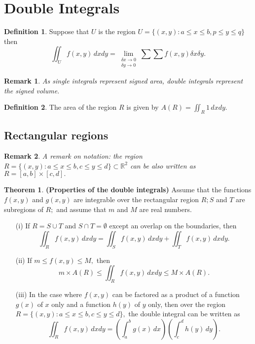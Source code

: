 \documentclass[12pt, a4paper]{article}
\newcommand{\bb}[1]{\mathbb{#1}}
\newtheorem*{remark}{Remark}
\theoremstyle{definition}
\newtheorem{definition}{Definition}[section]
\newtheorem{theorem}{Theorem}[section]
\theoremstyle{plain}
\begin{document}
\section{Double Integrals}

\begin{definition}
Suppose that $U$ is the region $U=\{(x,y) : a \leq x\leq b, p \leq y \leq q\}$ then $$\iint_U f(x,y)\, dxdy = \lim_{\substack{\delta x \to 0 \\ \delta y \to 0}} \sum \sum f(x,y) \delta x \delta y.$$
\end{definition}

\begin{remark}
As single integrals represent signed area, double integrals represent the signed volume.
\end{remark}

\begin{definition}
The area of the region $R$ is given by $A(R) = \iint_R 1 \, dxdy.$
\end{definition}

\subsection{Rectangular regions}

\begin{remark}
A remark on notation: the region $R = \{(x,y) : a \leq x \leq b, c\leq y \leq d\} \subset \bb{R}^2$ can be also written as $R=[a,b]\times[c,d].$
\end{remark}

\begin{theorem}
\textbf{(Properties of the double integrals)} Assume that the functions $f (x, y)$ and $g(x, y)$ are integrable over the rectangular region $R; S$ and $T$ are subregions of $R;$ and assume that $m$ and $M$ are real numbers. \begin{enumerate}
	
	\item[(i)] If $R=S \cup T$ and $S\cap T = \emptyset$ except an overlap on the boundaries, then $$\iint_Rf(x,y) \, dxdy = \iint_S f(x,y) \, dxdy+ \iint_T f(x,y) \, dxdy.$$

	\item[(ii)] If $m \leq f(x,y) \leq M,$ then $$m \times A(R) \leq \iint_R f(x,y) \, dxdy \leq M \times A(R).$$

	\item[(iii)] In the case where $f (x, y)$ can be factored as a product of a function $g(x)$ of $x$ only and a function $h(y)$ of $y$ only, then over the region $R = \{(x, y) : a \leq x \leq b, c \leq y \leq d\},$ the double integral can be written as $$\iint_R f(x,y) \, dxdy =\left(\int_a^b g(x) \, dx\right)\left(\int_c^d h(y) \, dy\right).$$

\end{enumerate}	
\end{theorem}
\end{document}
